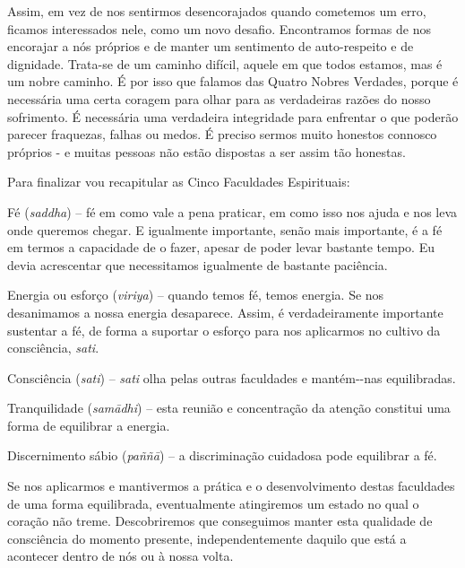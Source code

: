 Assim, em vez de nos sentirmos desencorajados quando cometemos um erro,
ficamos interessados nele, como um novo desafio. Encontramos formas de
nos encorajar a nós próprios e de manter um sentimento de auto-respeito
e de dignidade. \mbox{Trata-se} de um caminho difícil, aquele em que todos
estamos, mas é um nobre caminho. É por isso que falamos das Quatro
Nobres Verdades, porque é necessária uma certa coragem para olhar para
as verdadeiras razões do nosso sofrimento. É necessária uma verdadeira
integridade para enfrentar o que poderão parecer fraquezas, falhas ou
medos. É preciso sermos muito honestos connosco próprios - e muitas
pessoas não estão dispostas a ser assim tão honestas.

Para finalizar vou recapitular as Cinco Faculdades Espirituais:

Fé (\emph{saddha}) -- fé em como vale a pena praticar, em como isso nos ajuda
e nos leva onde queremos chegar. E igualmente importante, senão mais
importante, é a fé em termos a capacidade de o fazer, apesar de poder levar
bastante tempo. Eu devia acrescentar que necessitamos igualmente de bastante
paciência.

Energia ou esforço (\emph{viriya}) -- quando temos fé, temos energia. Se nos
desanimamos a nossa energia desaparece. Assim, é verdadeiramente importante
sustentar a fé, de forma a suportar o esforço para nos aplicarmos no cultivo
da consciência, \emph{sati}.

Consciência (\emph{sati}) -- \emph{sati} olha pelas outras faculdades e
mantém-\linebreak-nas equilibradas.

Tranquilidade (\emph{samādhi}) -- esta reunião e concentração da atenção
constitui uma forma de equilibrar a energia.

Discernimento sábio (\emph{paññā}) -- a discriminação cuidadosa pode
equilibrar a fé.

Se nos aplicarmos e mantivermos a prática e o desenvolvimento destas
faculdades de uma forma equilibrada, eventualmente atingiremos um estado
no qual o coração não treme. Descobriremos que conseguimos manter esta
qualidade de consciência do momento presente, independentemente daquilo
que está a acontecer dentro de nós ou à nossa volta.

